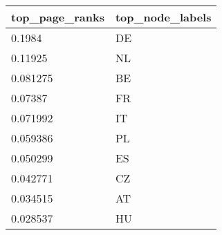 \begin{tabular}{ll}
top_page_ranks & top_node_labels \\ 
\hline 
0.1984 & DE \\ 
0.11925 & NL \\ 
0.081275 & BE \\ 
0.07387 & FR \\ 
0.071992 & IT \\ 
0.059386 & PL \\ 
0.050299 & ES \\ 
0.042771 & CZ \\ 
0.034515 & AT \\ 
0.028537 & HU \\ 
\hline 
\end{tabular}